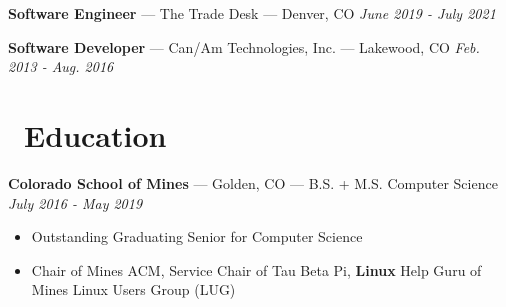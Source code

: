 \documentclass[10pt,letterpaper]{article}
\begin{document}
\vspace{3pt}
{\fontsize{11}{0}
\textbf{Software Engineer} --- The Trade Desk --- Denver, CO}
\hfill \textit{June 2019 - July 2021}




\vspace{3pt}
{\fontsize{11}{0}
\textbf{Software Developer} --- Can/Am Technologies, Inc. --- Lakewood, CO}
\hfill \textit{Feb. 2013 - Aug. 2016}


\section*{\faBook\ Education}
{\fontsize{11}{0}
\textbf{Colorado School of Mines} --- Golden, CO --- B.S. + M.S. Computer Science}
\hfill \textit{July 2016 - May 2019}
\begin{itemize}
    \item Outstanding Graduating Senior for Computer Science
    \item Chair of Mines ACM, Service Chair of Tau Beta Pi, \textbf{Linux} Help
        Guru of Mines Linux Users Group (LUG)
\end{itemize}
\end{document}
